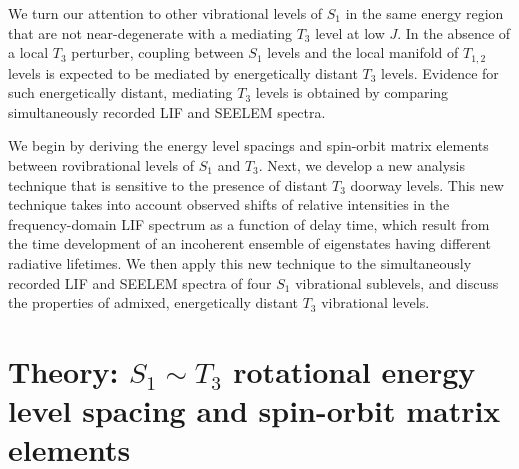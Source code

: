 We turn our attention to other vibrational levels of $S_1$ in the same
energy region that are not near-degenerate with a mediating $T_3$
level at low $J$.  In the absence of a local $T_3$ perturber, coupling
between $S_1$ levels and the local manifold of $T_{1,2}$ levels is
expected to be mediated by energetically distant $T_3$ levels.
Evidence for such energetically distant, mediating $T_3$ levels is
obtained by comparing simultaneously recorded LIF and SEELEM spectra.

We begin by deriving the energy level spacings and spin-orbit matrix
elements between rovibrational levels of $S_1$ and $T_3$.  Next, we
develop a new analysis technique that is sensitive to the presence of
distant $T_3$ doorway levels.  This new technique takes into account
observed shifts of relative intensities in the frequency-domain LIF
spectrum as a function of delay time, which result from the time
development of an incoherent ensemble of eigenstates having different
radiative lifetimes.  We then apply this new technique to the
simultaneously recorded LIF and SEELEM spectra of four $S_1$
vibrational sublevels, and discuss the properties of admixed,
energetically distant $T_3$ vibrational levels.

\section{Theory: $S_1 \sim T_3$ rotational energy level spacing and
  spin-orbit matrix elements}
\label{theory1}

